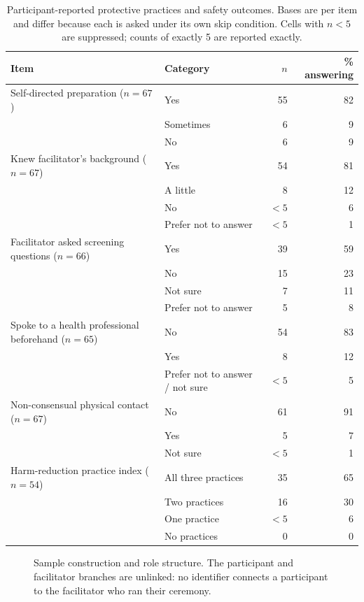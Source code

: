 \documentclass[12pt]{article}
\begin{document}
\begin{table}[htbp]
\centering
\caption{Participant-reported protective practices and safety outcomes. Bases are per item and differ
because each is asked under its own skip condition. Cells with $n<5$ are suppressed; counts of exactly 5
are reported exactly.}
\label{tab:safety}
\begin{tabular}{p{5.2cm}p{4.8cm}rr}
\toprule
Item & Category & $n$ & \% answering \\
\midrule
Self-directed preparation ($n=67$) & Yes & 55 & 82 \\
                & Sometimes & 6 & 9 \\
                & No & 6 & 9 \\
\addlinespace
Knew facilitator's background ($n=67$) & Yes & 54 & 81 \\
                & A little & 8 & 12 \\
                & No & $<5$ & 6 \\
                & Prefer not to answer & $<5$ & 1 \\
\addlinespace
Facilitator asked screening questions ($n=66$) & Yes & 39 & 59 \\
                & No & 15 & 23 \\
                & Not sure & 7 & 11 \\
                & Prefer not to answer & 5 & 8 \\
\addlinespace
Spoke to a health professional beforehand ($n=65$) & No & 54 & 83 \\
                & Yes & 8 & 12 \\
                & Prefer not to answer / not sure & $<5$ & 5 \\
\addlinespace
Non-consensual physical contact ($n=67$) & No & 61 & 91 \\
                & Yes & 5 & 7 \\
                & Not sure & $<5$ & 1 \\
\addlinespace
Harm-reduction practice index ($n=54$) & All three practices & 35 & 65 \\
                & Two practices & 16 & 30 \\
                & One practice & $<5$ & 6 \\
                & No practices & 0 & 0 \\
\bottomrule
\end{tabular}
\end{table}

\begin{figure}[htbp]
\centering
{}
\caption{Sample construction and role structure. The participant and facilitator branches are unlinked: no
identifier connects a participant to the facilitator who ran their ceremony.}
\label{fig:flow}
\end{figure}
\end{document}

